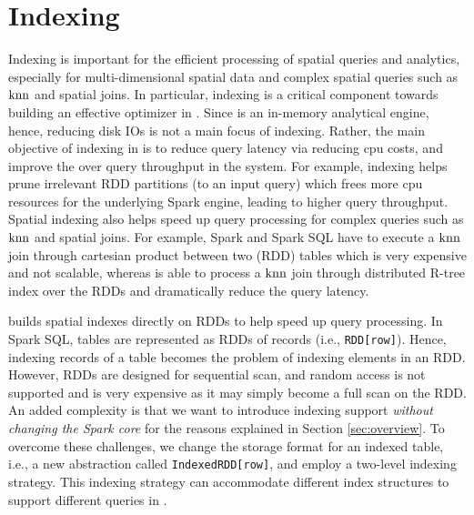 \vspace{-2mm}
\section{Indexing}
\label{sec:index}
Indexing is important for the efficient processing of spatial queries
and analytics, especially for multi-dimensional spatial data and
complex spatial queries such as $\operatorname{knn}$ and spatial joins. In
particular, indexing is a critical component towards building an
effective optimizer in \name. Since \name is an in-memory analytical
engine, hence, reducing disk IOs is not a main focus of
indexing. Rather, the main objective of indexing in \name is to reduce
query latency via reducing cpu costs, and improve the over query
throughput in the system. For example, indexing helps prune irrelevant
RDD partitions (to an input query) which frees more cpu resources for
the underlying Spark engine, leading to higher query
throughput. Spatial indexing also helps speed up query processing for
complex queries such as $\operatorname{knn}$ and spatial joins. For example, Spark
and Spark SQL have to execute a $\operatorname{knn}$ join through cartesian product
between two (RDD) tables which is very expensive and not scalable,
whereas \name is able to process a $\operatorname{knn}$ join through distributed
R-tree index over the RDDs and dramatically reduce the query latency.


\name builds spatial indexes directly on RDDs to help speed up query
processing.  In Spark SQL, tables are represented as RDDs of records
(i.e., \texttt{RDD[row]}). Hence, indexing records of a table becomes
the problem of indexing elements in an RDD. However, RDDs are designed
for sequential scan, and random access is not supported and is very
expensive as it may simply become a full scan on the RDD. An added
complexity is that we want to introduce indexing support {\em without
  changing the Spark core} for the reasons explained in Section
\ref{sec:overview}. To overcome these challenges, we change the
storage format for an indexed table, i.e., a new abstraction called
\texttt{IndexedRDD[row]}, and employ a two-level indexing
strategy. This indexing strategy can accommodate different index
structures to support different queries in \name.


